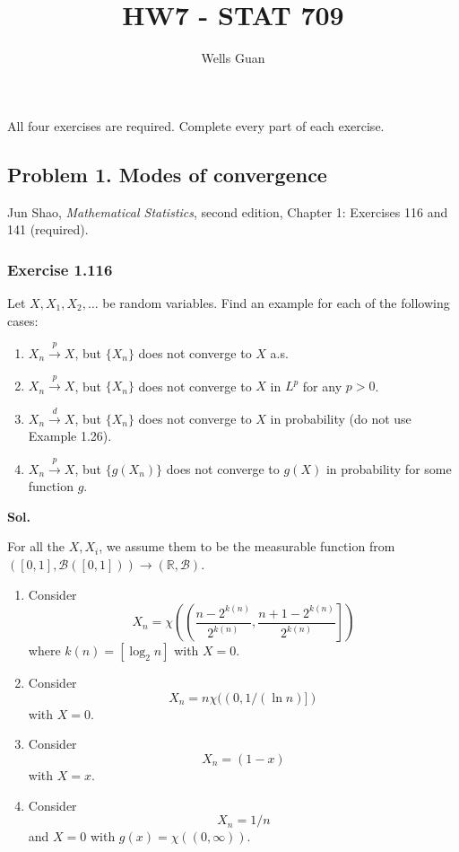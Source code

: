 \documentclass[lang=en,11pt,a4paper,citestyle=authoryear,nobib=true]{elegantpaper}
\title{HW7 - STAT 709}
\author{Wells Guan}
\newcommand{\R}{\mathbb{R}}
\begin{document}
\maketitle

\noindent All four exercises are required. Complete every part of each exercise.

\subsection*{Problem 1. Modes of convergence}
Jun Shao, \textit{Mathematical Statistics}, second edition, Chapter 1:
Exercises 116 and 141 (required).

\subsubsection*{Exercise 1.116}
Let $X,X_1,X_2,\ldots$ be random variables. Find an example for each of
the following cases:
\begin{enumerate}[label=(\alph*),leftmargin=*]
\item $X_n\xrightarrow{p}X$, but $\{X_n\}$ does not converge to $X$ a.s.
\item $X_n\xrightarrow{p}X$, but $\{X_n\}$ does not converge to $X$ in $L^p$
for any $p>0$.
\item $X_n\xrightarrow{d}X$, but $\{X_n\}$ does not converge to $X$ in
probability (do not use Example 1.26).
\item $X_n\xrightarrow{p}X$, but $\{g(X_n)\}$ does not converge to $g(X)$ in
probability for some function $g$.
\end{enumerate}

\par\vspace{0.5em}\noindent\textbf{Sol.}\par
For all the $X,X_i$, we assume them to be the measurable function from $([0,1],\mathcal{B}([0,1])) \to (\R,\mathcal{B})$.
\begin{enumerate}[label=(\alph*),leftmargin=*]
\item Consider \[X_n = \chi\left(\left(\dfrac{n-2^{k(n)}}{2^{k(n)}},\dfrac{n+1-2^{k(n)}}{2^{k(n)}}\right]\right)\] where $k(n) = \left[\log_2 n\right]$ with $X = 0$.
\item Consider
\[
X_n = n\chi((0,1/(\ln n)])
\]
with $X = 0$.
\item Consider
\[
X_n = (1-x)
\]
with $X = x$.
\item Consider
\[
X_n = 1/n
\]
and $X = 0$ with $g(x) = \chi((0,\infty))$.
\end{enumerate}
\end{document}
